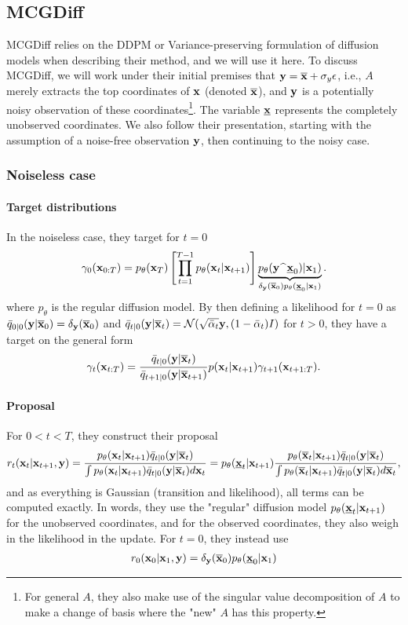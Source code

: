 \subsection{MCGDiff}
MCGDiff relies on the DDPM or Variance-preserving formulation of diffusion models when describing their method, and we will use it here. To discuss MCGDiff, we will work under their initial premises that $\mathbf{y} = \overline{\mathbf{x}} + \sigma_y\epsilon$, i.e., $A$ merely extracts the top coordinates of $\mathbf{x}$ (denoted $\overline{\mathbf{x}}$), and $\mathbf{y}$ is a potentially noisy observation of these coordinates\footnote{For general $A$, they also make use of the singular value decomposition of $A$ to make a change of basis where the "new" $A$ has this property.}. The variable $\underline{\mathbf{x}}$ represents the completely unobserved coordinates. We also follow their presentation, starting with the assumption of a noise-free observation $\mathbf{y}$, then continuing to the noisy case.

\subsubsection{Noiseless case}
\paragraph{Target distributions}
In the noiseless case, they target for $t=0$
\begin{align}
    \gamma_0(\mathbf{x}_{0:T}) = p_\theta(\mathbf{x}_T) \left[\prod_{t=1}^{T-1}p_\theta(\mathbf{x}_{t}|\mathbf{x}_{t+1}) \right]\underbrace{p_\theta(\mathbf{y} \ \widehat{} \  \underline{\mathbf{x}}_0)|\mathbf{x}_1)}_{\delta_{\mathbf{y}}(\overline{\mathbf{x}}_0)p_\theta(\underline{\mathbf{x}}_0|\mathbf{x}_1)}.
\end{align}
where $p_\theta$ is the regular diffusion model. By then defining a likelihood for $t=0$ as $\bar q_{0|0}(\mathbf{y}|\overline{\mathbf{x}}_0) = \delta_{\mathbf{y}}(\overline{\mathbf{x}}_0)$ and $\bar q_{t|0}(\mathbf{y}|\overline{\mathbf{x}}_t) = \mathcal{N}(\sqrt{\bar\alpha_t}\mathbf{y}, (1-\bar\alpha_t)I)$ for $t>0$, they have a target on the general form
\begin{align}
    \gamma_t(\mathbf{x}_{t:T}) = \frac{\bar q_{t|0}(\mathbf{y}|\overline{\mathbf{x}}_t)}{\bar q_{t+1|0}(\mathbf{y}|\overline{\mathbf{x}}_{t+1})}p(\mathbf{x}_{t}|\mathbf{x}_{t+1})\gamma_{t+1}(\mathbf{x}_{t+1:T}).
\end{align}

\paragraph{Proposal}
For $0<t<T$, they construct their proposal
\begin{align}
    r_t(\mathbf{x}_{t}|\mathbf{x}_{t+1}, \mathbf{y}) = \frac{p_\theta(\mathbf{x}_{t}|\mathbf{x}_{t+1})\bar q_{t|0}(\mathbf{y}|\overline{\mathbf{x}}_t)}{\int p_\theta(\mathbf{x}_{t}|\mathbf{x}_{t+1})\bar q_{t|0}(\mathbf{y}|\overline{\mathbf{x}}_t) d\mathbf{x}_{t}} 
    = p_\theta(\underline{\mathbf{x}}_t|\mathbf{x}_{t+1})\frac{p_\theta(\overline{\mathbf{x}}_t|\mathbf{x}_{t+1})\bar q_{t|0}(\mathbf{y}|\overline{\mathbf{x}}_t)}{\int p_\theta(\overline{\mathbf{x}}_t|\mathbf{x}_{t+1})\bar q_{t|0}(\mathbf{y}|\overline{\mathbf{x}}_t) d\overline{\mathbf{x}}_t},
\end{align}
and as everything is Gaussian (transition and likelihood), all terms can be computed exactly. In words, they use the "regular" diffusion model $p_\theta(\underline{\mathbf{x}}_t|\mathbf{x}_{t+1})$ for the unobserved coordinates, and for the observed coordinates, they also weigh in the likelihood in the update. For $t=0$, they instead use
\begin{align}
    r_0(\mathbf{x}_0|\mathbf{x}_1, \mathbf{y}) = \delta_{\mathbf{y}}(\overline{\mathbf{x}}_0)p_\theta(\underline{\mathbf{x}}_0|\mathbf{x}_1)
\end{align}

